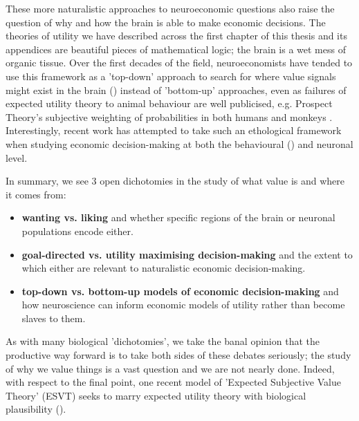 These more naturalistic approaches to neuroeconomic questions also raise the question of why and how the brain is able to make economic decisions. The theories of utility we have described across the first chapter of this thesis and its appendices are beautiful pieces of mathematical logic; the brain is a wet mess of organic tissue. Over the first decades of the field, neuroeconomists have tended to use this framework as a 'top-down' approach to search for where value signals might exist in the brain (\cite{wuEmergingStandardNeurobiological2018}) instead of 'bottom-up' approaches, even as failures of expected utility theory to animal behaviour are well publicised, e.g. Prospect Theory's subjective weighting of probabilities in both humans \cite{kahnemanProspectTheoryAnalysis1979} and monkeys \cite{bujoldComparingUtilityFunctions2022}. Interestingly, recent work has attempted to take such an ethological framework when studying economic decision-making at both the behavioural (\cite{glimcherEfficientlyIrrationalIlluminating2022}) and neuronal \cite{polaniaEfficientCodingSubjective2019} level.

In summary, we see 3 open dichotomies in the study of what value is and where it comes from:

\begin{itemize}
    \item \textbf{wanting vs. liking} and whether specific regions of the brain or neuronal populations encode either. 
    \item \textbf{goal-directed vs. utility maximising decision-making} and the extent to which either are relevant to naturalistic economic decision-making.
    \item \textbf{top-down vs. bottom-up models of economic decision-making} and how neuroscience can inform economic models of utility rather than become slaves to them.
\end{itemize}

As with many biological 'dichotomies', we take the banal opinion that the productive way forward is to take both sides of these debates seriously; the study of why we value things is a vast question and we are not nearly done. Indeed, with respect to the final point, one recent model of 'Expected Subjective Value Theory' (ESVT) seeks to marry expected utility theory with biological plausibility (\cite{glimcherExpectedSubjectiveValue2023}).